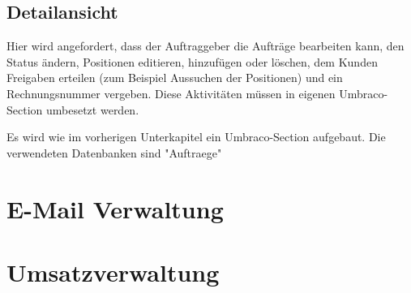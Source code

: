 \subsection{Detailansicht}

Hier wird angefordert, dass der Auftraggeber die Aufträge bearbeiten kann, den Status ändern, Positionen editieren, hinzufügen oder löschen, dem Kunden Freigaben erteilen (zum Beispiel Aussuchen der Positionen) und ein Rechnungsnummer vergeben. Diese Aktivitäten müssen in eigenen Umbraco-Section umbesetzt werden. 

Es wird wie im vorherigen Unterkapitel ein Umbraco-Section aufgebaut. Die verwendeten Datenbanken sind "Auftraege"

\section{E-Mail Verwaltung}
\section{Umsatzverwaltung}


